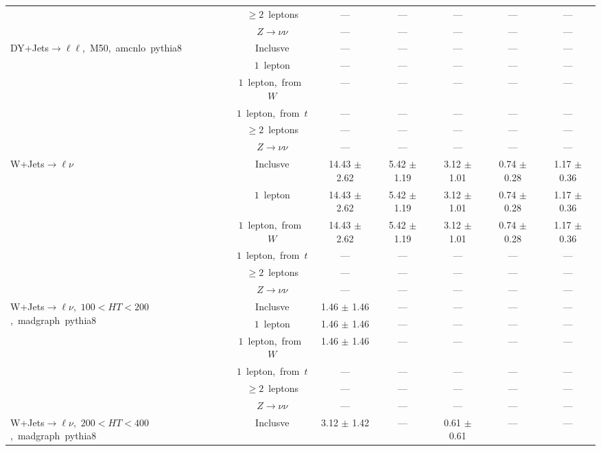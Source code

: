 \documentclass{article}
\begin{document}
\begin{longtable}{|l|c|c|c|c|c|c|}
 & $\ge2$~leptons  & ---  & ---  & ---  & ---  & --- \\* 
 & $Z\rightarrow\nu\nu$  & ---  & ---  & ---  & ---  & --- \\* 
\hline 
\multirow{6}{*}{DY+Jets$\rightarrow\ell\ell$,~M50,~amcnlo~pythia8} & Inclusve  & ---  & ---  & ---  & ---  & --- \\* 
 & $1$~lepton  & ---  & ---  & ---  & ---  & --- \\* 
 & $1$~lepton,~from~$W$  & ---  & ---  & ---  & ---  & --- \\* 
 & $1$~lepton,~from~$t$  & ---  & ---  & ---  & ---  & --- \\* 
 & $\ge2$~leptons  & ---  & ---  & ---  & ---  & --- \\* 
 & $Z\rightarrow\nu\nu$  & ---  & ---  & ---  & ---  & --- \\* 
\hline 
\multirow{6}{*}{W+Jets$\rightarrow\ell\nu$} & Inclusve  & 14.43 $\pm$ 2.62  & 5.42 $\pm$ 1.19  & 3.12 $\pm$ 1.01  & 0.74 $\pm$ 0.28  & 1.17 $\pm$ 0.36 \\* 
 & $1$~lepton  & 14.43 $\pm$ 2.62  & 5.42 $\pm$ 1.19  & 3.12 $\pm$ 1.01  & 0.74 $\pm$ 0.28  & 1.17 $\pm$ 0.36 \\* 
 & $1$~lepton,~from~$W$  & 14.43 $\pm$ 2.62  & 5.42 $\pm$ 1.19  & 3.12 $\pm$ 1.01  & 0.74 $\pm$ 0.28  & 1.17 $\pm$ 0.36 \\* 
 & $1$~lepton,~from~$t$  & ---  & ---  & ---  & ---  & --- \\* 
 & $\ge2$~leptons  & ---  & ---  & ---  & ---  & --- \\* 
 & $Z\rightarrow\nu\nu$  & ---  & ---  & ---  & ---  & --- \\* 
\hline 
\multirow{6}{*}{W+Jets$\rightarrow\ell\nu$,~$100<HT<200$,~madgraph~pythia8} & Inclusve  & 1.46 $\pm$ 1.46  & ---  & ---  & ---  & --- \\* 
 & $1$~lepton  & 1.46 $\pm$ 1.46  & ---  & ---  & ---  & --- \\* 
 & $1$~lepton,~from~$W$  & 1.46 $\pm$ 1.46  & ---  & ---  & ---  & --- \\* 
 & $1$~lepton,~from~$t$  & ---  & ---  & ---  & ---  & --- \\* 
 & $\ge2$~leptons  & ---  & ---  & ---  & ---  & --- \\* 
 & $Z\rightarrow\nu\nu$  & ---  & ---  & ---  & ---  & --- \\* 
\hline 
\multirow{6}{*}{W+Jets$\rightarrow\ell\nu$,~$200<HT<400$,~madgraph~pythia8} & Inclusve  & 3.12 $\pm$ 1.42  & ---  & 0.61 $\pm$ 0.61  & ---  & --- \\* 

\end{longtable}
\end{document}
